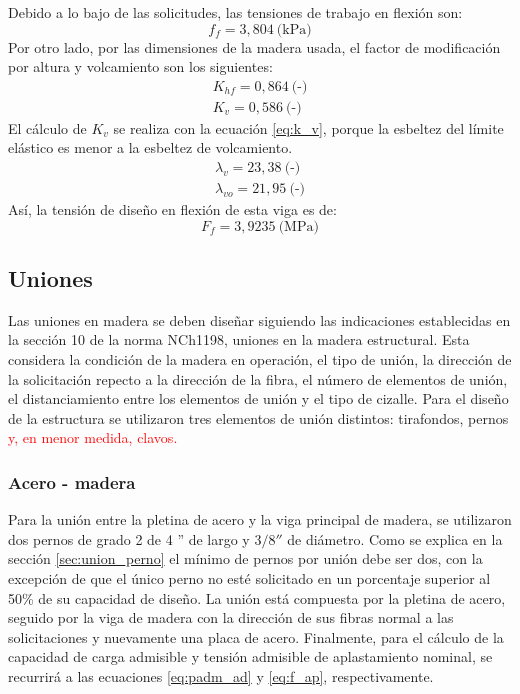 Debido a lo bajo de las solicitudes, las tensiones de trabajo en flexión son:
\begin{equation}
	f_f = 3,804 \: \text{(kPa)} 
\end{equation}
Por otro lado, por las dimensiones de la madera usada, el factor de modificación por altura y volcamiento son los siguientes:
\begin{gather*}
	K_{hf} = 0,864\: \text{(-)}\\
	K_{v} = 0,586\: \text{(-)}
\end{gather*}
El cálculo de $K_v$ se realiza con la ecuación \ref{eq:k_v}, porque la esbeltez del límite elástico es menor a la esbeltez de volcamiento.
\begin{gather*}
	\lambda_v = 23,38 \: \text{(-)}\\
	\lambda_{vo} = 21,95 \: \text{(-)}
\end{gather*}
Así, la tensión de diseño en flexión de esta viga es de:
\begin{equation}
	F_f = 3,9235 \: \text{(MPa)}
\end{equation}
\subsection{Uniones}
Las uniones en madera se deben diseñar siguiendo las indicaciones establecidas en la sección 10 de la norma NCh1198, uniones en la madera estructural. Esta considera la condición de la madera en operación, el tipo de unión, la dirección de la solicitación repecto a la dirección de la fibra, el número de elementos de unión, el distanciamiento entre los elementos de unión y el tipo de cizalle. Para el diseño de la estructura se utilizaron tres elementos de unión distintos: tirafondos, pernos \textcolor{red}{ y, en menor medida, clavos.}

\subsubsection{Acero - madera}
Para la unión entre la pletina de acero y la viga principal de madera, se utilizaron dos pernos de grado 2 de 4 '' de largo y  $3/8''$ de diámetro. Como se explica en la sección \ref{sec:union_perno} el mínimo de pernos por unión debe ser dos, con la excepción de que el único perno no esté solicitado en un porcentaje superior al 50\% de su capacidad de diseño. La unión está compuesta por la pletina de acero, seguido por la viga de madera con la dirección de sus fibras normal a las solicitaciones y nuevamente una placa de acero. Finalmente, para el cálculo de la capacidad de carga admisible y tensión admisible de aplastamiento nominal, se recurrirá a las ecuaciones \ref{eq:padm_ad} y \ref{eq:f_ap}, respectivamente. 

